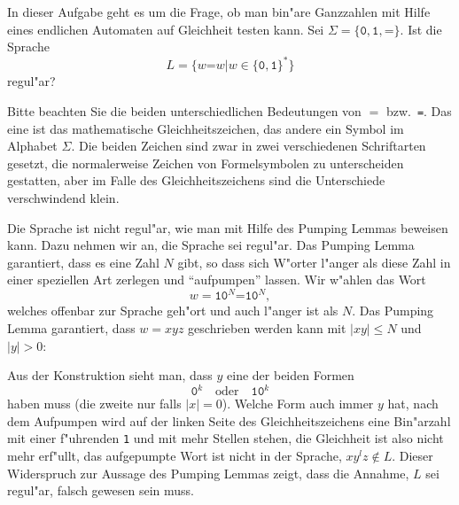 In dieser Aufgabe geht es um die Frage, ob man bin"are Ganzzahlen mit
Hilfe eines endlichen Automaten auf Gleichheit testen kann.
Sei $\Sigma=\{\texttt{0},\texttt{1},\texttt{=}\}$. Ist die Sprache
\[
L=\{ w\texttt{=}w|w\in \{\texttt{0},\texttt{1}\}^*\}
\]
regul"ar?

\begin{hinweis}
Bitte beachten Sie die beiden unterschiedlichen Bedeutungen von $=$
bzw.~\texttt{=}.
Das eine ist das mathematische Gleichheitszeichen, das andere ein Symbol
im Alphabet $\Sigma$.
Die beiden Zeichen sind zwar in zwei verschiedenen Schriftarten gesetzt,
die normalerweise Zeichen von Formelsymbolen zu unterscheiden gestatten,
aber im Falle des Gleichheitszeichens sind die Unterschiede verschwindend
klein.
\end{hinweis}

\begin{loesung}
Die Sprache ist nicht regul"ar, wie man mit Hilfe des Pumping
Lemmas beweisen kann.
Dazu nehmen wir an, die Sprache sei regul"ar.
Das Pumping Lemma garantiert, dass es eine Zahl $N$ gibt, so dass
sich W"orter l"anger als diese Zahl in einer speziellen Art
zerlegen und ``aufpumpen'' lassen.
Wir w"ahlen das Wort
\[
w=\texttt{10}^N\texttt{=10}^N,
\]
welches offenbar zur Sprache geh"ort und auch l"anger ist als $N$.
Das Pumping Lemma garantiert, dass $w=xyz$  geschrieben werden kann
mit $|xy|\le N$ und $|y|>0$:
\begin{center}
\end{center}
Aus der Konstruktion sieht man, dass $y$ eine der beiden Formen
\[
\texttt{0}^k
\quad\text{oder}\quad
\texttt{10}^k
\]
haben muss (die zweite nur falls $|x|=0$).
Welche Form auch immer $y$ hat, nach dem Aufpumpen wird
auf der linken Seite des Gleichheitszeichens eine Bin"arzahl mit
einer f"uhrenden \texttt{1} und mit mehr Stellen stehen, die Gleichheit
ist also nicht mehr erf"ullt, das aufgepumpte Wort ist nicht in der
Sprache, $xy^lz\not\in L$.
Dieser Widerspruch zur Aussage des Pumping
Lemmas zeigt, dass die Annahme, $L$ sei regul"ar, falsch gewesen
sein muss.
\end{loesung}


